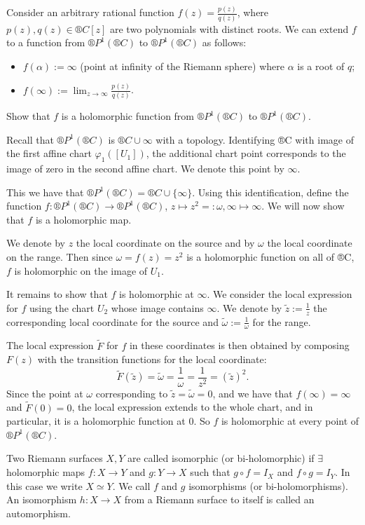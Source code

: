 \documentclass[12pt]{article}					%
\begin{document}
\begin{priklad}[Eg]
	Consider an arbitrary rational function $f(z) = \frac{p(z)}{q(z)}$, where $p(z), q(z) \in ®C[z]$ are two polynomials with distinct roots. We can extend $f$ to a function from $®P^1(®C)$ to $®P^1(®C)$ as follows:
	\begin{itemize}
		\item $f(α) := ∞$ (point at infinity of the Riemann sphere) where $α$ is a root of $q$;
		\item $f(∞) := \lim_{z \rightarrow ∞} \frac{p(z)}{q(z)}$.
	\end{itemize}

	Show that $f$ is a holomorphic function from $®P^1(®C)$ to $®P^1(®C)$.

	Recall that $®P^1(®C)$ is $®C \cup ∞$ with a topology. Identifying ®C with image of the first affine chart $φ_1([U_1])$, the additional chart point corresponds to the image of zero in the second affine chart. We denote this point by $∞$.

	This we have that $®P^1(®C) = ®C \cup \{∞\}$. Using this identification, define the function $f: ®P^1(®C) \rightarrow ®P^1(®C)$, $z \mapsto z^2 =: ω, ∞ \mapsto ∞$. We will now show that $f$ is a holomorphic map.

	We denote by $z$ the local coordinate on the source and by $ω$ the local coordinate on the range. Then since $ω = f(z) = z^2$ is a holomorphic function on all of ®C, $f$ is holomorphic on the image of $U_1$.

	It remains to show that $f$ is holomorphic at $∞$. We consider the local expression for $f$ using the chart $U_2$ whose image contains $∞$. We denote by $\tilde z := \frac{1}{z}$ the corresponding local coordinate for the source and $\tilde ω := \frac{1}{ω}$ for the range.

	The local expression $\tilde F$ for $f$ in these coordinates is then obtained by composing $F(z)$ with the transition functions for the local coordinate:
	$$ \tilde F(\tilde z) = \tilde ω = \frac{1}{ω} = \frac{1}{z^2} = (\tilde z)^2. $$
	Since the point at $ω$ corresponding to $\tilde z = \tilde ω = 0$, and we have that $f(∞) = ∞$ and $\tilde F(0) = 0$, the local expression extends to the whole chart, and in particular, it is a holomorphic function at $0$. So $f$ is holomorphic at every point of $®P^1(®C)$.
\end{priklad}

\begin{definice}
	Two Riemann surfaces $X, Y$ are called isomorphic (or bi-holomorphic) if $\exists$ holomorphic maps $f: X \rightarrow Y$ and $g: Y \rightarrow X$ such that $g ∘ f = I_X$ and $f ∘ g = I_Y$. In this case we write $X \simeq Y$. We call $f$ and $g$ isomorphisms (or bi-holomorphisms). An isomorphism $h: X \rightarrow X$ from a Riemann surface to itself is called an automorphism.
\end{definice}
\end{document}
